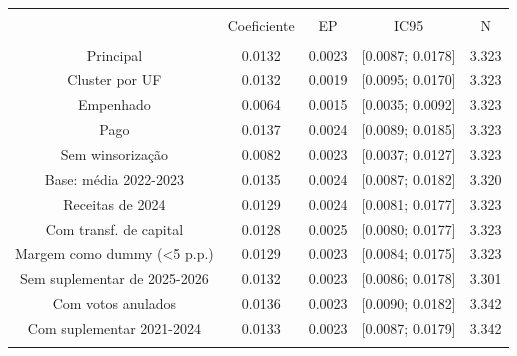 
\begin{table}[!htbp] \centering 
  \caption{} 
  \label{} 
\begin{tabular}{@{\extracolsep{5pt}} ccccc} 
\\[-1.8ex]\hline 
\hline \\[-1.8ex] 
 & Coeficiente & EP & IC95 & N \\ 
\hline \\[-1.8ex] 
Principal & 0.0132 & 0.0023 & [0.0087; 0.0178] & 3.323 \\ 
Cluster por UF & 0.0132 & 0.0019 & [0.0095; 0.0170] & 3.323 \\ 
Empenhado & 0.0064 & 0.0015 & [0.0035; 0.0092] & 3.323 \\ 
Pago & 0.0137 & 0.0024 & [0.0089; 0.0185] & 3.323 \\ 
Sem winsorização & 0.0082 & 0.0023 & [0.0037; 0.0127] & 3.323 \\ 
Base: média 2022-2023 & 0.0135 & 0.0024 & [0.0087; 0.0182] & 3.320 \\ 
Receitas de 2024 & 0.0129 & 0.0024 & [0.0081; 0.0177] & 3.323 \\ 
Com transf. de capital & 0.0128 & 0.0025 & [0.0080; 0.0177] & 3.323 \\ 
Margem como dummy (\textless  5 p.p.) & 0.0129 & 0.0023 & [0.0084; 0.0175] & 3.323 \\ 
Sem suplementar de 2025-2026 & 0.0132 & 0.0023 & [0.0086; 0.0178] & 3.301 \\ 
Com votos anulados & 0.0136 & 0.0023 & [0.0090; 0.0182] & 3.342 \\ 
Com suplementar 2021-2024 & 0.0133 & 0.0023 & [0.0087; 0.0179] & 3.342 \\ 
\hline \\[-1.8ex] 
\end{tabular} 
\end{table} 
